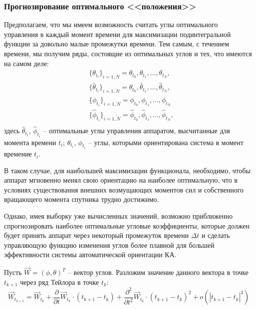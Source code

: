 \subsubsection{Прогнозирование оптимального <<положения>>}
\noindent\indent Предполагаем, что мы имеем возможность считать углы оптимального
управления в каждый момент времени для максимизации подинтегральной функции за довольно
малые промежутки времени. Тем самым, с течением времени, мы получим ряды, состоящие
из оптимальных углов и тех, что имеются на самом деле:
\begin{equation}
  \begin{aligned}
    &\{\theta_{t_i}\}_{i=\overline{1,N}} = \theta_{t_0}, \theta_{t_1}, ..., \theta_{t_N}, \\
    &\{\hat{\theta}_{t_i}\}_{i=\overline{1,N}} = \hat{\theta}_{t_0}, \hat{\theta}_{t_1}, ..., \hat{\theta}_{t_N}, \\
    &\{\phi_{t_i}\}_{i=\overline{1,N}} = \phi_{t_0}, \phi_{t_1}, ..., \phi_{t_N} \\
    &\{\hat{\phi}_{t_i}\}_{i=\overline{1,N}} = \hat{\phi}_{t_0}, \hat{\phi}_{t_1}, ..., \hat{\phi}_{t_N}, \\
  \end{aligned}
\end{equation}
здесь $\hat{\theta}_{t_i}$, $\hat{\phi}_{t_i}$ -- оптимальные углы управления аппаратом,
высчитанные для момента времени $t_i$; $\theta_{t_i}$, $\phi_{t_i}$ -- углы, которыми
ориентирована система в момент времение $t_i$.\par
  В таком случае, для наибольшей максимизации функционала, необходимо, чтобы
аппарат мгновенно менял свою ориентацию на наиболее оптимальную, что в условиях
существования внешних возмущающих моментов сил и собственного вращающего момента
спутника трудно достижимо.\par
  Однако, имея выборку уже вычисленных значений, возможно приближенно спрогнозировать
наиболее оптимальные угловые коэффициенты, которые должен будет принять аппарат
через некоторый промежуток времени $\Delta t$ и сделать управляющую функцию изменения
углов более плавной для большей эффективности системы автоматической ориентации КА.\par
  Пусть $\vec{W} = (\phi, \theta)^T$ -- вектор углов. Разложим значение данного вектора
в точке $t_{k+1}$ через ряд Тейлора в точке $t_{k}$:
\begin{equation} \label{eq:parialWEquatation}
  \vec{W}_{t_{k+1}} = \vec{W}_{t_{k}}
  + \frac{\partial}{\partial t}\vec{W}_{t_{k}} \cdot (t_{k+1} - t_{k})
  + \frac{\partial^2}{\partial t^2}\vec{W}_{t_{k}} \cdot (t_{k+1} - t_{k})^2
  + o(|t_{k+1} - t_{k}|^3)
\end{equation}\par
